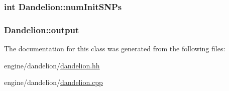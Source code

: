 \label{classDandelion_aa966dd7a7a67dd93522d912aacba581c}
\hypertarget{classDandelion_af9f4a50b7b9d5ec2876f87244f171fde}{
\subsubsection[{numInitSNPs}]{\setlength{\rightskip}{0pt plus 5cm}int {\bf Dandelion::numInitSNPs}}}
\label{classDandelion_af9f4a50b7b9d5ec2876f87244f171fde}
\hypertarget{classDandelion_ae3ac17eb2241e0c91255789c941dde82}{
\subsubsection[{output}]{ {\bf Dandelion::output}}}
\label{classDandelion_ae3ac17eb2241e0c91255789c941dde82}


The documentation for this class was generated from the following files:\begin{DoxyCompactItemize}
\item 
engine/dandelion/\hyperlink{dandelion_8hh}{dandelion.hh}\item 
engine/dandelion/\hyperlink{dandelion_8cpp}{dandelion.cpp}\end{DoxyCompactItemize}
